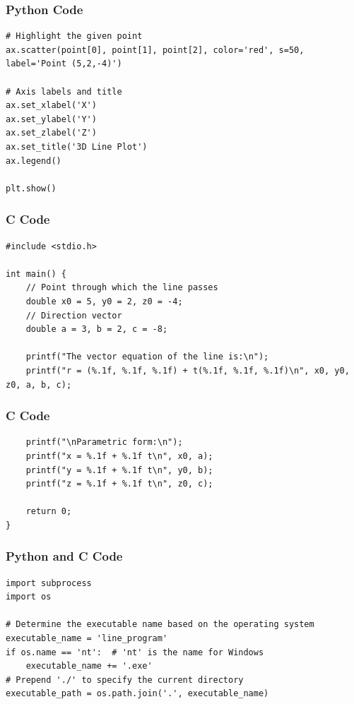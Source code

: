\documentclass{beamer}
\begin{document}
\begin{frame}[fragile]
    \frametitle{Python Code}
    \begin{lstlisting}
# Highlight the given point
ax.scatter(point[0], point[1], point[2], color='red', s=50, label='Point (5,2,-4)')

# Axis labels and title
ax.set_xlabel('X')
ax.set_ylabel('Y')
ax.set_zlabel('Z')
ax.set_title('3D Line Plot')
ax.legend()

plt.show()
    \end{lstlisting}
\end{frame}



\begin{frame}[fragile]
\frametitle{C Code}
\begin{lstlisting}
#include <stdio.h>

int main() {
    // Point through which the line passes
    double x0 = 5, y0 = 2, z0 = -4;
    // Direction vector
    double a = 3, b = 2, c = -8;

    printf("The vector equation of the line is:\n");
    printf("r = (%.1f, %.1f, %.1f) + t(%.1f, %.1f, %.1f)\n", x0, y0, z0, a, b, c);
\end{lstlisting}
\end{frame}

\begin{frame}[fragile]
\frametitle{C Code}
\begin{lstlisting}
    printf("\nParametric form:\n");
    printf("x = %.1f + %.1f t\n", x0, a);
    printf("y = %.1f + %.1f t\n", y0, b);
    printf("z = %.1f + %.1f t\n", z0, c);

    return 0;
}
\end{lstlisting}
\end{frame}

\begin{frame}[fragile]
\frametitle{Python and C Code}
\begin{lstlisting}
import subprocess
import os

# Determine the executable name based on the operating system
executable_name = 'line_program'
if os.name == 'nt':  # 'nt' is the name for Windows
    executable_name += '.exe'
# Prepend './' to specify the current directory
executable_path = os.path.join('.', executable_name)
\end{lstlisting}
\end{frame}
\end{document}
